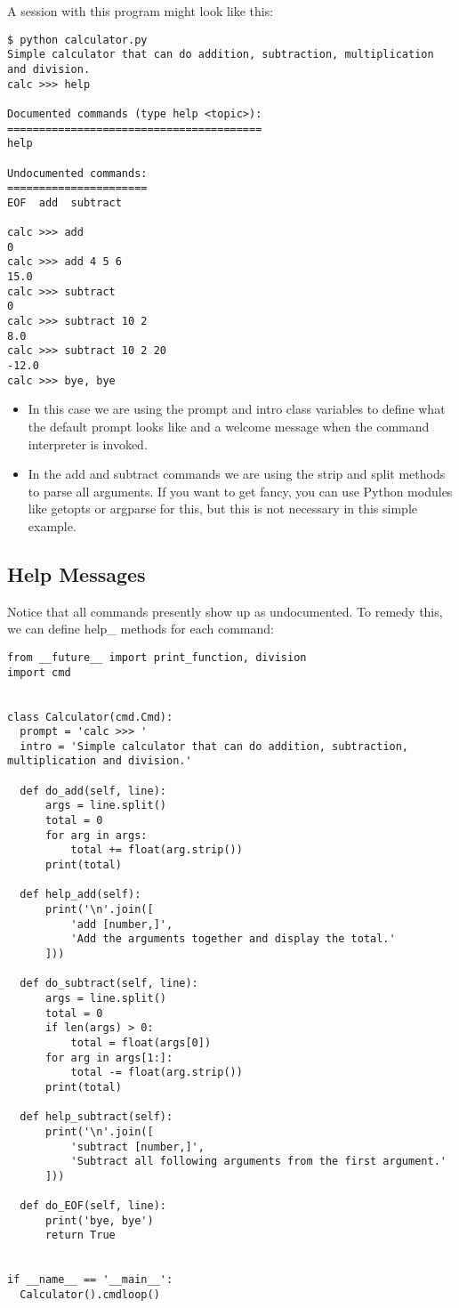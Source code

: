 A session with this program might look like this:

\begin{lstlisting}
$ python calculator.py
Simple calculator that can do addition, subtraction, multiplication and division.
calc >>> help

Documented commands (type help <topic>):
========================================
help

Undocumented commands:
======================
EOF  add  subtract

calc >>> add
0
calc >>> add 4 5 6
15.0
calc >>> subtract
0
calc >>> subtract 10 2
8.0
calc >>> subtract 10 2 20
-12.0
calc >>> bye, bye
\end{lstlisting}

\begin{itemize}

\item
  In this case we are using the prompt and intro class variables to
  define what the default prompt looks like and a welcome message when
  the command interpreter is invoked.
\item
  In the add and subtract commands we are using the strip and split
  methods to parse all arguments. If you want to get fancy, you can use
  Python modules like getopts or argparse for this, but this is not
  necessary in this simple example.
\end{itemize}

\subsection{Help Messages}\label{help-messages}

Notice that all commands presently show up as undocumented. To remedy
this, we can define help\_ methods for each command:

\begin{lstlisting}
from __future__ import print_function, division
import cmd


class Calculator(cmd.Cmd):
  prompt = 'calc >>> '
  intro = 'Simple calculator that can do addition, subtraction, multiplication and division.'

  def do_add(self, line):
      args = line.split()
      total = 0
      for arg in args:
          total += float(arg.strip())
      print(total)

  def help_add(self):
      print('\n'.join([
          'add [number,]',
          'Add the arguments together and display the total.'
      ]))

  def do_subtract(self, line):
      args = line.split()
      total = 0
      if len(args) > 0:
          total = float(args[0])
      for arg in args[1:]:
          total -= float(arg.strip())
      print(total)

  def help_subtract(self):
      print('\n'.join([
          'subtract [number,]',
          'Subtract all following arguments from the first argument.'
      ]))

  def do_EOF(self, line):
      print('bye, bye')
      return True


if __name__ == '__main__':
  Calculator().cmdloop()
\end{lstlisting}

